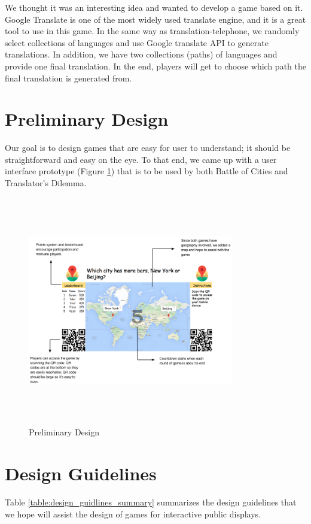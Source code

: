 \documentclass{sig-alternate}
\begin{document}
We thought it was an interesting idea and wanted to develop a game based on it. Google Translate is one of the most widely used translate engine, and it is a great tool to use in this game. In the same way as translation-telephone, we randomly select collections of languages and use Google translate API to generate translations. In addition, we have two collections (paths) of languages and provide one final translation. In the end, players will get to choose which path the final translation is generated from.

\section{Preliminary Design}
Our goal is to design games that are easy for user to understand; it should be straightforward and easy on the eye. To that end, we came up with a user interface prototype (Figure \ref{fig:pre_design}) that is to be used by both Battle of Cities and Translator's Dilemma. 

\begin{figure}
	\centering
	\includegraphics[width=0.8\textwidth,height=10cm]{preliminary_design.png}
	\caption{Preliminary Design}
	\label{fig:pre_design}
\end{figure}

\section{Design Guidelines}
Table \ref{table:design_guidlines_summary} summarizes the design guidelines that we hope will assist the design of games for interactive public displays.
\end{document}
